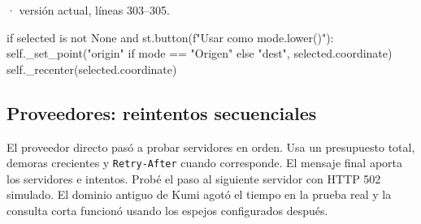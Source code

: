 \documentclass[11pt,a4paper]{article}
\begin{document}
\smallskip
{\footnotesize\texttt{} · versión actual, líneas 303--305.}\par
\begin{Codigo}[firstnumber=303]
            if selected is not None and st.button(f"Usar como {mode.lower()}"):
                self._set_point("origin" if mode == "Origen" else "dest", selected.coordinate)
                self._recenter(selected.coordinate)
\end{Codigo}

\subsection{Proveedores: reintentos secuenciales}
El proveedor directo pasó a probar servidores en orden. Usa un presupuesto total, demoras crecientes y \texttt{Retry-After} cuando corresponde. El mensaje final aporta los servidores e intentos. Probé el paso al siguiente servidor con HTTP 502 simulado. El dominio antiguo de Kumi agotó el tiempo en la prueba real y la consulta corta funcionó usando los espejos configurados después.
\end{document}

